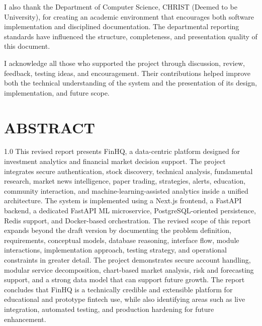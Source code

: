 \documentclass[12pt,a4paper]{report}
\newcommand{\projectshort}{FinHQ}
\begin{document}
I also thank the Department of Computer Science, CHRIST (Deemed to be University), for creating an academic environment that encourages both software implementation and disciplined documentation. The departmental reporting standards have influenced the structure, completeness, and presentation quality of this document.

I acknowledge all those who supported the project through discussion, review, feedback, testing ideas, and encouragement. Their contributions helped improve both the technical understanding of the system and the presentation of its design, implementation, and future scope.

\chapter*{ABSTRACT}
\begin{spacing}{1.0}
This revised report presents \projectshort, a data-centric platform designed for investment analytics and financial market decision support. The project integrates secure authentication, stock discovery, technical analysis, fundamental research, market news intelligence, paper trading, strategies, alerts, education, community interaction, and machine-learning-assisted analytics inside a unified architecture. The system is implemented using a Next.js frontend, a FastAPI backend, a dedicated FastAPI ML microservice, PostgreSQL-oriented persistence, Redis support, and Docker-based orchestration. The revised scope of this report expands beyond the draft version by documenting the problem definition, requirements, conceptual models, database reasoning, interface flow, module interactions, implementation approach, testing strategy, and operational constraints in greater detail. The project demonstrates secure account handling, modular service decomposition, chart-based market analysis, risk and forecasting support, and a strong data model that can support future growth. The report concludes that \projectshort{} is a technically credible and extensible platform for educational and prototype fintech use, while also identifying areas such as live integration, automated testing, and production hardening for future enhancement.
\end{spacing}

{\pagestyle{empty}\tableofcontents\clearpage}
\listoftables
{}
\clearpage
\listoffigures
{}
\clearpage
\end{document}
